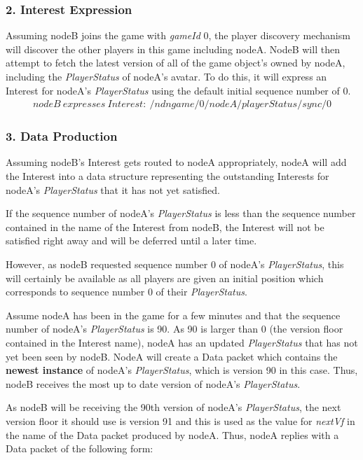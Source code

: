 \subsubsection{2. Interest Expression}
Assuming nodeB joins the game with \textit{gameId} 0, the player discovery mechanism will discover the other players in this game including nodeA. NodeB will then attempt to fetch the latest version of all of the game object's owned by nodeA, including the \textit{PlayerStatus} of nodeA's avatar. To do this, it will express an Interest for nodeA's \textit{PlayerStatus} using the default initial sequence number of 0.
\begin{align*}
    nodeB\ expresses\ Interest:\ /ndngame/0/nodeA/playerStatus/sync/0
\end{align*}

\subsubsection{3. Data Production}
Assuming nodeB's Interest gets routed to nodeA appropriately, nodeA will add the Interest into a data structure representing the outstanding Interests for nodeA's \textit{PlayerStatus} that it has not yet satisfied.

If the sequence number of nodeA's \textit{PlayerStatus} is less than the sequence number contained in the name of the Interest from nodeB, the Interest will not be satisfied right away and will be deferred until a later time.

However, as nodeB requested sequence number 0 of nodeA's \textit{PlayerStatus}, this will certainly be available as all players are given an initial position which corresponds to sequence number 0 of their \textit{PlayerStatus}.

Assume nodeA has been in the game for a few minutes and that the sequence number of nodeA's \textit{PlayerStatus} is 90. As 90 is larger than 0 (the version floor contained in the Interest name), nodeA has an updated \textit{PlayerStatus} that has not yet been seen by nodeB. NodeA will create a Data packet which contains the \textbf{newest instance} of nodeA's \textit{PlayerStatus}, which is version 90 in this case. Thus, nodeB receives the most up to date version of nodeA's \textit{PlayerStatus}.

As nodeB will be receiving the 90th version of nodeA's \textit{PlayerStatus}, the next version floor it should use is version 91 and this is used as the value for \textit{nextVf} in the name of the Data packet produced by nodeA. Thus, nodeA replies with a Data packet of the following form:

